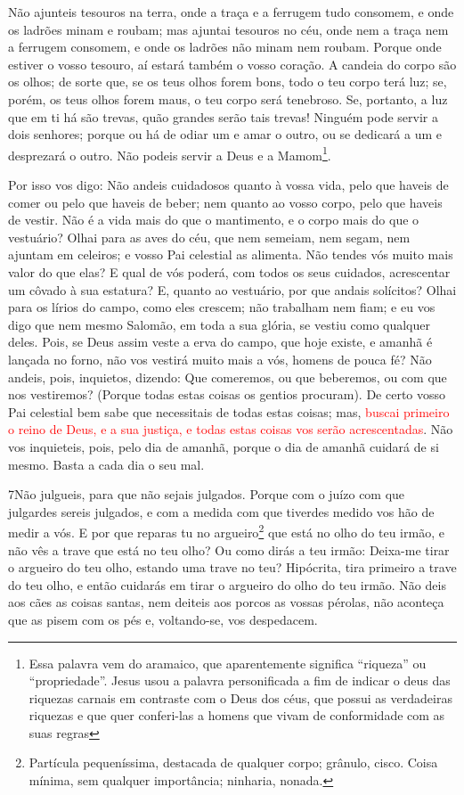 Não ajunteis tesouros na terra, onde a traça e a ferrugem tudo
consomem, e onde os ladrões minam e roubam; mas ajuntai
tesouros no céu, onde nem a traça nem a ferrugem consomem, e onde os
ladrões não minam nem roubam. Porque onde estiver o vosso
tesouro, aí estará também o vosso coração. A candeia do corpo
são os olhos; de sorte que, se os teus olhos forem bons, todo o teu
corpo terá luz; se, porém, os teus olhos forem maus, o teu
corpo será tenebroso. Se, portanto, a luz que em ti há são trevas,
quão grandes serão tais trevas! Ninguém pode servir a dois
senhores; porque ou há de odiar um e amar o outro, ou se dedicará a
um e desprezará o outro. Não podeis servir a Deus e a
Mamom\footnote{Essa palavra vem do aramaico, que aparentemente
significa ``riqueza'' ou ``propriedade''. Jesus usou a palavra
personificada a fim de indicar o deus das riquezas carnais em
contraste com o Deus dos céus, que possui as verdadeiras riquezas e
que quer conferi-las a homens que vivam de conformidade com as suas
regras}.

Por isso vos digo: Não andeis cuidadosos quanto à vossa vida,
pelo que haveis de comer ou pelo que haveis de beber; nem quanto ao
vosso corpo, pelo que haveis de vestir. Não é a vida mais do que o
mantimento, e o corpo mais do que o vestuário? Olhai para as
aves do céu, que nem semeiam, nem segam, nem ajuntam em celeiros; e
vosso Pai celestial as alimenta. Não tendes vós muito mais valor do
que elas? E qual de vós poderá, com todos os seus cuidados,
acrescentar um côvado à sua estatura? E, quanto ao vestuário,
por que andais solícitos? Olhai para os lírios do campo, como eles
crescem; não trabalham nem fiam; e eu vos digo que nem mesmo
Salomão, em toda a sua glória, se vestiu como qualquer deles.
Pois, se Deus assim veste a erva do campo, que hoje existe, e
amanhã é lançada no forno, não vos vestirá muito mais a vós, homens
de pouca fé? Não andeis, pois, inquietos, dizendo: Que
comeremos, ou que beberemos, ou com que nos vestiremos?
 (Porque todas estas coisas os gentios procuram). De certo
vosso Pai celestial bem sabe que necessitais de todas estas coisas;
mas, \textcolor{red}{buscai primeiro o reino de Deus, e a sua
justiça, e todas estas coisas vos serão acrescentadas}. Não
vos inquieteis, pois, pelo dia de amanhã, porque o dia de amanhã
cuidará de si mesmo. Basta a cada dia o seu mal.

\medskip

\lettrine{7} Não julgueis, para que não sejais julgados.
Porque com o juízo com que julgardes sereis julgados, e com a
medida com que tiverdes medido vos hão de medir a vós. E por que
reparas tu no argueiro\footnote{Partícula pequeníssima, destacada de
qualquer corpo; grânulo, cisco. Coisa mínima, sem qualquer
importância; ninharia, nonada.} que está no olho do teu irmão, e não
vês a trave que está no teu olho? Ou como dirás a teu irmão:
Deixa-me tirar o argueiro do teu olho, estando uma trave no teu?
Hipócrita, tira primeiro a trave do teu olho, e então cuidarás
em tirar o argueiro do olho do teu irmão. Não deis aos cães as
coisas santas, nem deiteis aos porcos as vossas pérolas, não
aconteça que as pisem com os pés e, voltando-se, vos despedacem.

